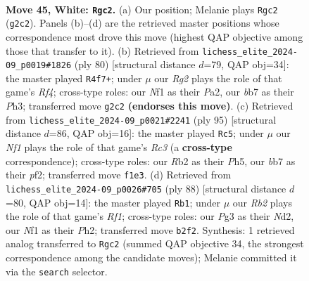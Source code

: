 \documentclass[11pt]{article}
\begin{document}
\clearpage

\begin{figure}[p]\centering
\begin{subfigure}{0.46\textwidth}\centering
\resizebox{\linewidth}{!}{%
\newchessgame
\chessboard[
  setfen={6k1/1b3p2/5np1/7p/8/5qP1/1R4RP/5NK1 w - - 2 45},
  showmover=false,
  pgfstyle=straightmove, color=movearrow, markmove={g2-c2}
]}
\caption{}
\end{subfigure}\hfill
\begin{subfigure}{0.46\textwidth}\centering
\resizebox{\linewidth}{!}{%
\newchessgame
\chessboard[
  setfen={5R2/2p3kp/p2p4/2b1q3/1p2PRK1/1B5P/P7/8 w - - 12 41},
  showmover=false,
  pgfstyle=straightmove, color=movearrow, markmove={f4-f7}
]}
\caption{}
\end{subfigure}
\\[4pt]
\begin{subfigure}{0.46\textwidth}\centering
\resizebox{\linewidth}{!}{%
\newchessgame
\chessboard[
  setfen={8/2r3k1/2r2pp1/7p/5Q2/6P1/5PKP/8 b - - 3 48},
  showmover=false,
  pgfstyle=straightmove, color=movearrow, markmove={c6-c5}
]}
\caption{}
\end{subfigure}\hfill
\begin{subfigure}{0.46\textwidth}\centering
\resizebox{\linewidth}{!}{%
\newchessgame
\chessboard[
  setfen={8/6kp/6p1/p1bBqp2/2P5/P2R2P1/2KN3P/5R2 w - - 0 45},
  showmover=false,
  pgfstyle=straightmove, color=movearrow, markmove={f1-b1}
]}
\caption{}
\end{subfigure}
\caption{\textbf{Move 45, White: \texttt{Rgc2}.} (a) Our position; Melanie plays \texttt{Rgc2} (\texttt{g2c2}). Panels (b)--(d) are the retrieved master positions whose correspondence most drove this move (highest QAP objective among those that transfer to it). (b) Retrieved from \texttt{lichess\_elite\_2024-09\_p0019\#1826} (ply 80) [structural distance $d$=79, QAP obj=34]: the master played \texttt{R4f7+}; under $\mu$ our \emph{Rg2} plays the role of that game's \emph{Rf4}; cross-type roles: our \emph{N}f1 as their \emph{P}a2, our \emph{b}b7 as their \emph{P}h3; transferred move \texttt{g2c2} \textbf{(endorses this move)}. (c) Retrieved from \texttt{lichess\_elite\_2024-09\_p0021\#2241} (ply 95) [structural distance $d$=86, QAP obj=16]: the master played \texttt{Rc5}; under $\mu$ our \emph{Nf1} plays the role of that game's \emph{Rc3} (a \textbf{cross-type} correspondence); cross-type roles: our \emph{R}b2 as their \emph{P}h5, our \emph{b}b7 as their \emph{p}f2; transferred move \texttt{f1e3}. (d) Retrieved from \texttt{lichess\_elite\_2024-09\_p0026\#705} (ply 88) [structural distance $d$=80, QAP obj=14]: the master played \texttt{Rb1}; under $\mu$ our \emph{Rb2} plays the role of that game's \emph{Rf1}; cross-type roles: our \emph{P}g3 as their \emph{N}d2, our \emph{N}f1 as their \emph{P}h2; transferred move \texttt{b2f2}. Synthesis: 1 retrieved analog transferred to \texttt{Rgc2} (summed QAP objective 34, the strongest correspondence among the candidate moves); Melanie committed it via the \texttt{search} selector.}
\label{fig:thought-m88}
\end{figure}
\end{document}
